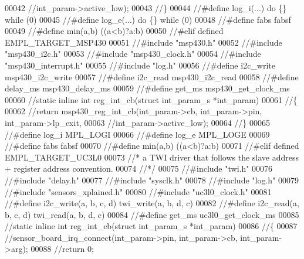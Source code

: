 \begin{DoxyCode}
00042         \textcolor{comment}{//int\_param->active\_low);}
00043 \textcolor{comment}{//\}}
00044 \textcolor{comment}{//#define log\_i(...)     do \{\} while (0)}
00045 \textcolor{comment}{//#define log\_e(...)     do \{\} while (0)}
00048 \textcolor{comment}{}\textcolor{comment}{//#define fabs        fabsf}
00049 \textcolor{comment}{//#define min(a,b) ((a<b)?a:b)}
00050 \textcolor{comment}{//#elif defined EMPL\_TARGET\_MSP430}
00051 \textcolor{comment}{//#include "msp430.h"}
00052 \textcolor{comment}{//#include "msp430\_i2c.h"}
00053 \textcolor{comment}{//#include "msp430\_clock.h"}
00054 \textcolor{comment}{//#include "msp430\_interrupt.h"}
00055 \textcolor{comment}{//#include "log.h"}
00056 \textcolor{comment}{//#define i2c\_write   msp430\_i2c\_write}
00057 \textcolor{comment}{//#define i2c\_read    msp430\_i2c\_read}
00058 \textcolor{comment}{//#define delay\_ms    msp430\_delay\_ms}
00059 \textcolor{comment}{//#define get\_ms      msp430\_get\_clock\_ms}
00060 \textcolor{comment}{//static inline int reg\_int\_cb(struct int\_param\_s *int\_param)}
00061 \textcolor{comment}{//\{}
00062     \textcolor{comment}{//return msp430\_reg\_int\_cb(int\_param->cb, int\_param->pin, int\_param->lp\_exit,}
00063         \textcolor{comment}{//int\_param->active\_low);}
00064 \textcolor{comment}{//\}}
00065 \textcolor{comment}{//#define log\_i       MPL\_LOGI}
00066 \textcolor{comment}{//#define log\_e       MPL\_LOGE}
00069 \textcolor{comment}{}\textcolor{comment}{//#define fabs        fabsf}
00070 \textcolor{comment}{//#define min(a,b) ((a<b)?a:b)}
00071 \textcolor{comment}{//#elif defined EMPL\_TARGET\_UC3L0}
00073 \textcolor{comment}{} \textcolor{comment}{//* a TWI driver that follows the slave address + register address convention.}
00074  \textcolor{comment}{//*/}
00075 \textcolor{comment}{//#include "twi.h"}
00076 \textcolor{comment}{//#include "delay.h"}
00077 \textcolor{comment}{//#include "sysclk.h"}
00078 \textcolor{comment}{//#include "log.h"}
00079 \textcolor{comment}{//#include "sensors\_xplained.h"}
00080 \textcolor{comment}{//#include "uc3l0\_clock.h"}
00081 \textcolor{comment}{//#define i2c\_write(a, b, c, d)   twi\_write(a, b, d, c)}
00082 \textcolor{comment}{//#define i2c\_read(a, b, c, d)    twi\_read(a, b, d, c)}
00084 \textcolor{comment}{}\textcolor{comment}{//#define get\_ms  uc3l0\_get\_clock\_ms}
00085 \textcolor{comment}{//static inline int reg\_int\_cb(struct int\_param\_s *int\_param)}
00086 \textcolor{comment}{//\{}
00087     \textcolor{comment}{//sensor\_board\_irq\_connect(int\_param->pin, int\_param->cb, int\_param->arg);}
00088     \textcolor{comment}{//return 0;}

\end{DoxyCode}
